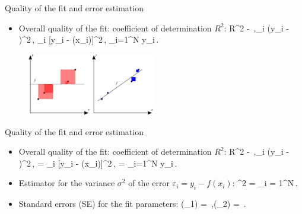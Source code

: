 \documentclass[10pt,aspectratio=169,handout]{beamer}
\begin{document}
\begin{frame}{Quality of the fit and error estimation}
	\begin{itemize}
		\item Overall quality of the fit: coefficient of determination $R^2$:
		\bea
			R^2  - \,,\equiv \sum_i (y_i - )^2\,, \equiv \sum_i [y_i - \fhat(x_i)]^2\,,\quad {} \equiv {}\sum_{i=1}^N y_i\,.
		\eea
	\end{itemize}
\begin{figure}
	\centering
	\includegraphics[width=0.5\textwidth]{fig/rsq}
\end{figure}
\end{frame}


\begin{frame}{Quality of the fit and error estimation}
	\begin{itemize}[<+->]
		\item Overall quality of the fit: coefficient of determination $R^2$:
		\bea
		R^2  - \,,\equiv \sum_i (y_i - )^2\,, = \sum_i [y_i - \fhat(x_i)]^2\,,\quad {} = \sum_{i=1}^N y_i\,.
		\eea
		\item Estimator for the variance $\sigma^2$ of the error $\varepsilon_i = y_i - f(x_i)$:
		\bea
		\sigmahat^2 = \sum_{i = 1}^N\,.
		\eea
		\item Standard errors (SE) for the fit parameters:
		\bea
			(\beta_1) = \sigmahat{}\,,\quad {}(\beta_2) = \sigmahat{}\,.
		\eea
	\end{itemize}

\end{frame}
\end{document}
